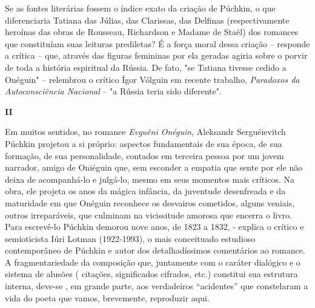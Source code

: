 Se as fontes literárias fossem o índice exato da criação de Púchkin, o
que diferenciaria Tatiana das Júlias, das Clarissas, das Delfinas
(respectivamente heroínas das obras de Rousseau, Richardson e Madame de
Staël) dos romances que constituíam suas leituras prediletas? É a força
moral dessa criação -- responde a crítica -- que, através das figuras
femininas por ela geradas agiria sobre o porvir de toda a história
espiritual da Rússia. De fato, "se Tatiana tivesse cedido a Onéguin" --
relembrou o crítico Ígor Vólguin em recente trabalho, \emph{Paradoxos da
Autoconsciência Nacional} -- "a Rússia teria sido diferente".

\textbf{II}

Em muitos sentidos, no romance \emph{Evguêni Onéguin}, Aleksandr
Serguéievitch Púchkin projetou a si próprio: aspectos fundamentais de
sua época, de sua formação, de sua personalidade, contados em terceira
pessoa por um jovem narrador, amigo de Oniéguin que, sem esconder a
empatia que sente por ele não deixa de acompanhá-lo e julgá-lo, mesmo em
seus momentos mais críticos. Na obra, ele projeta os anos da mágica
infância, da juventude desenfreada e da maturidade em que Onéguin
reconhece os desvairos cometidos, alguns veniais, outros irreparáveis,
que culminam na vicissitude amorosa que encerra o livro. Para escrevê-lo
Púchkin demorou nove anos, de 1823 a 1832, - explica o crítico e
semioticista Iúri Lotman (1922-1993), o mais conceituado estudioso
contemporâneo de Púchkin e autor dos detalhadíssimos comentários ao
romance. A fragmentariedade da composição que, juntamente com o caráter
dialógico e o sistema de alusões ( citações, significados cifrados,
etc.) constitui sua estrutura interna, deve-se , em grande parte, aos
verdadeiros ``acidentes'' que constelaram a vida do poeta que vamos,
brevemente, reproduzir aqui.

